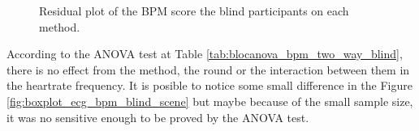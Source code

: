 \begin{figure}[!htb]
\begin{minipage}{0.45\textwidth}
        \caption{Residual plot of the BPM score the blind participants on each method.}
        \label{fig:residplot_bpm_two_way}
    \end{minipage}
\end{figure}


%


According to the ANOVA test at Table \ref{tab:blocanova_bpm_two_way_blind}, there is no effect from the method, the round or the interaction between them in the heartrate frequency. It is posible to notice some small difference in the Figure \ref{fig:boxplot_ecg_bpm_blind_scene} but maybe because of the small sample size, it was no sensitive enough to be proved by the ANOVA test.

\FloatBarrier